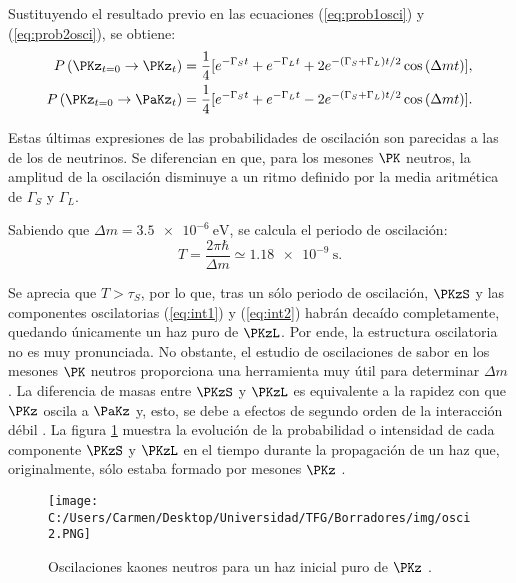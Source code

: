 Sustituyendo el resultado previo en las ecuaciones (\ref{eq:prob1osci}) y (\ref{eq:prob2osci}), se obtiene:
\begin{align}
P\left(\PKz_{t=0} \rightarrow \PKz_{t}\right) &= \dfrac{1}{4}[e^{-\Gamma_{S}t}+e^{-\Gamma_{L}t}+ 2e^{-\left(\Gamma_{S}+\Gamma_{L}\right)t/2} \cos \left(\Delta mt\right)],\label{eq:int1} \\
P\left(\PKz_{t=0} \rightarrow \PaKz_{t}\right) &= \dfrac{1}{4}[e^{-\Gamma_{S}t}+e^{-\Gamma_{L}t}-2e^{-\left(\Gamma_{S}+\Gamma_{L}\right)t/2} \cos \left(\Delta mt\right)].\label{eq:int2}
\end{align}

Estas últimas expresiones de las probabilidades de oscilación son parecidas a las de los de neutrinos. Se diferencian en que, para los mesones $\PK$ neutros, la amplitud de la oscilación disminuye a un ritmo definido por la media aritmética de $\Gamma_{S}$ y $\Gamma_{L}$.

Sabiendo que $\Delta m = \SI{3,5e-6}{\eV}$, se calcula el periodo de oscilación:
\begin{equation}
T=\dfrac{2\pi\hbar}{\Delta m} \simeq \SI{1.18e-9}{\second}.
\end{equation}

Se aprecia que $T>\tau_{S}$, por lo que, tras un sólo periodo de oscilación, $\PKzS$ y las componentes oscilatorias (\ref{eq:int1}) y (\ref{eq:int2}) habrán decaído completamente, quedando únicamente un haz puro de $\PKzL$. Por ende, la estructura oscilatoria no es muy pronunciada.  No obstante, el estudio de oscilaciones de sabor en los mesones $\PK$ neutros proporciona una herramienta muy útil para determinar $\Delta m$ \cite{Thomson}. La diferencia de masas entre $\PKzS$ y $\PKzL$ es equivalente a la rapidez con que $\PKz$ oscila a $\PaKz$ y, esto, se debe a efectos de segundo orden de la interacción débil \cite{Perkins}. La figura \ref{fig:oscillation2} muestra la evolución de la probabilidad o intensidad de cada componente $\PKzS$ y $\PKzL$ en el tiempo durante la propagación de un haz que, originalmente, sólo estaba formado por mesones $\PKz$ \cite{Thomson}. 

\begin{figure}[!ht]
	\centering
	\texttt{[image: C:/Users/Carmen/Desktop/Universidad/TFG/Borradores/img/osci2.PNG]}
	\caption[Efecto de las oscilaciones de sabor en mesones $\PK$ neutros.]
	{Oscilaciones kaones neutros para un haz inicial puro de $\PKz$ \cite{Thomson}.}
	\label{fig:oscillation2}
\end{figure}